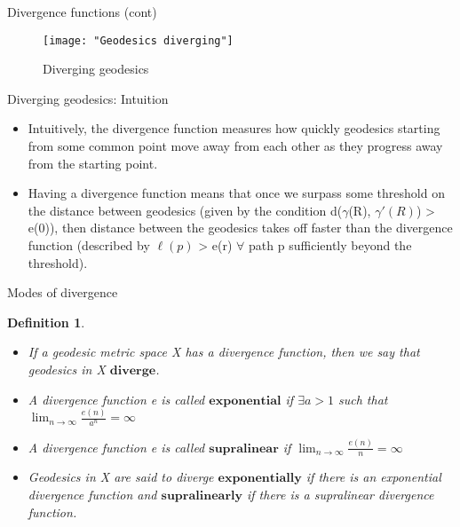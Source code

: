 \documentclass[11pt]{beamer}
\newcommand{\vs}{\vskip10pt}
\newtheorem{defn}[theorem]{Definition}
\begin{document}
\begin{frame}{Divergence functions (cont)}
	
\begin{figure}
	\centering
	\texttt{[image: "Geodesics diverging"]}
	\caption{Diverging geodesics}
	\label{fig:diverging-geodesics}
\end{figure}
	
	
\end{frame}

\begin{frame}{Diverging geodesics: Intuition}
	
	\begin{itemize}
		\item Intuitively, the divergence function measures how quickly geodesics starting from some common point move away from each other as they progress away from the starting point. 
		\vs
		\item Having a divergence function means that once we surpass some threshold on the distance between geodesics (given by the condition d($\gamma$(R), $\gamma'(R)$) > e(0)), then distance between the geodesics takes off faster than the divergence function (described by $\ell (p)$ > e(r) $\forall $ path p sufficiently beyond the threshold).
	\end{itemize}
	
\end{frame}

\begin{frame}{Modes of divergence}
	
		\begin{defn}
		
		\begin{itemize}
			\item If a geodesic metric space X has a divergence function, then we say that geodesics in X $\mathbf{diverge}$. 
			\item A divergence function e is called $\mathbf{exponential }$ if $\exists a > 1 $ such that $\lim_{n \rightarrow \infty} \frac{e(n)}{a^n} = \infty$
			\item A divergence function e is called $\mathbf{supralinear}$ if $\lim_{n \rightarrow \infty} \frac{e(n)}{n} = \infty$
			\item Geodesics in X are said to diverge $\mathbf{exponentially}$ if there is an exponential divergence function and $\mathbf{supralinearly}$ if there is a supralinear divergence function.
		\end{itemize}
		
	\end{defn}	
	
\end{frame}
\end{document}
